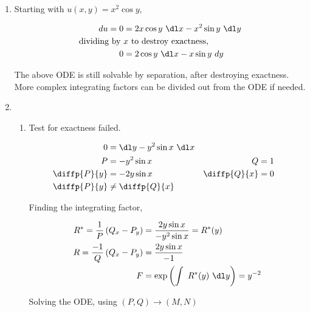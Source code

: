 \begin{enumerate}
    \item Starting with $ u(x, y) = x^{2} \cos y $,

          \begin{align}
              du = 0               & = 2x \cos y\ \dl x - x^{2} \sin y\ \dl y \\
              \text{dividing by}\  & x\ \text{to destroy exactness,}          \\
              0                    & = 2\cos y\ \dl x - x\sin y \ dy
          \end{align}

          The above ODE is still solvable by separation, after destroying exactness.
          More complex integrating factors can be divided out from the ODE if needed.

    \item
          \begin{enumerate}
              \item Test for exactness failed.

                    \begin{align}
                        0            & = \dl y - y^{2}\sin x\ \dl x   \\
                        P            & = -y^{2}\sin x               &
                        Q            & = 1                            \\
                        \diffp{P}{y} & = -2y\sin x                  &
                        \diffp{Q}{x} & = 0                            \\
                        \diffp{P}{y} & \neq \diffp{Q}{x}
                    \end{align}

                    Finding the integrating factor,

                    \begin{align}
                        R^{*} = \frac{1}{P} \left( Q_{x} - P_{y} \right)
                         & = \frac{2y\sin x}{-y^{2}\sin x}    = R^{*}(y)       \\
                        R = \frac{-1}{Q}\left( Q_{x} - P_{y} \right)
                         & = \frac{2y\sin x}{-1}                               \\
                        F
                         & = \exp \left( \int\ R^{*}(y)\ \dl y\right) = y^{-2}
                    \end{align}

                    Solving the ODE, using $ (P, Q) \to (M, N) $


\end{enumerate}
\end{enumerate}
